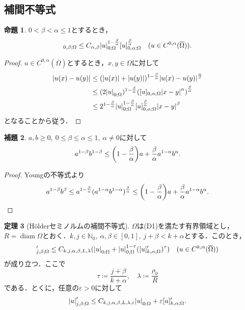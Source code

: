\documentclass[a4paper]{ltjsarticle}
\newcommand{\Nset}{\mathbb{N}}
\newcommand{\Om}{\Omega}
\newcommand{\Ombar}{\overline{\Omega}}
\newcommand{\1}{\mathbbm{1}}
\DeclareMathOperator{\diam}{\mathrm{diam}}
\numberwithin{equation}{section}
\theoremstyle{definition}
\newtheorem{thm}{定理}[section]
\newtheorem{prop}[thm]{命題}
\newtheorem{lem}[thm]{補題}
\begin{document}
\subsection{補間不等式}
\begin{prop}\label{prop:holder_interpolation}
    $0<\beta<\alpha\leq 1$とするとき，
    \begin{equation}
        [u]_{0,\beta;\Om}\leq C_{\alpha,\beta}\abs{u}_{0;\Om}^{1-\frac{\beta}{\alpha}}[u]_{0,\alpha;\Om}^{\frac{\beta}{\alpha}}\quad (u\in C^{0,\alpha}(\Ombar)).
    \end{equation}
\end{prop}
\begin{proof}
    $u\in C^{0,\alpha}(\Ombar)$とするとき，$x,y\in\Om$に対して
    \begin{align}
        \abs{u(x)-u(y)}&\leq (\abs{u(x)}+\abs{u(y)})^{1-\frac{\beta}{\alpha}}\abs{u(x)-u(y)}^{\frac{\alpha}{\beta}}\\
        &\leq (2\abs{u}_{0;\Om})^{1-\frac{\beta}{\alpha}}\qty([u]_{0,\alpha;\Om}\abs{x-y}^{\alpha})^{\frac{\beta}{\alpha}}\\
        &\leq 2^{1-\frac{\beta}{\alpha}}\abs{u}_{0;\Om}^{1-\frac{\beta}{\alpha}}[u]_{0,\alpha;\Om}^{\frac{\beta}{\alpha}}\abs{x-y}^{\beta}
    \end{align}
    となることから従う．
\end{proof}
\begin{lem}\label{lem:of_interpolation}
    $a,b\geq0,\ 0\leq \beta\leq \alpha\leq 1,\ \alpha\neq0$に対して 
    \begin{equation}
        a^{1-\beta}b^{1-\beta}\leq \qty(1-\frac{\beta}{\alpha})a+\frac{\beta}{\alpha}a^{1-\alpha}b^{\alpha}.
    \end{equation}
\end{lem}
\begin{proof}
    Youngの不等式より
    \begin{equation}
        a^{1-\beta}b^{\beta}\leq a^{1-\frac{\beta}{\alpha}}(a^{1-\alpha}b^{1-\alpha})^{\frac{\beta}{\alpha}}\leq \qty(1-\frac{\beta}{\alpha})a+\frac{\beta}{\alpha}a^{1-\alpha}b^{\alpha}.
    \end{equation}
\end{proof}
\begin{thm}[Hölderセミノルムの補間不等式]\label{thm:holder_interpolation}
    $\Om$は(D1)を満たす有界領域とし，$R=\diam \Om$とおく．$k,j\in\Nset_0,\ \alpha,\beta\in[0,1],\ j+\beta<k+\alpha$とする．このとき，
    \begin{equation}
        [u]_{j,\beta;\Om}'\leq C_{k,j,\alpha,\beta,L,\lambda}(\abs{u}_{0;\Om}+\abs{u}_{0,\Om}^{1-\tau}([u]_{k,\alpha;\Om}')^{\tau})\quad (u\in C^{k,\alpha}(\Ombar))
    \end{equation}
    が成り立つ．ここで
    \begin{equation}
        \tau\coloneqq \frac{j+\beta}{k+\alpha},\quad \lambda\coloneqq \frac{\rho_0}{R}
    \end{equation}
    である．とくに，任意の$\varepsilon>0$に対して
    \begin{equation}
        \abs{u}_{j,\beta;\Om}'\leq C_{k,j,\alpha,\beta,L,\lambda,\varepsilon}\abs{u}_{0;\Om}+\varepsilon[u]_{k,\alpha;\Om}'.
    \end{equation}
\end{thm}
\end{document}
